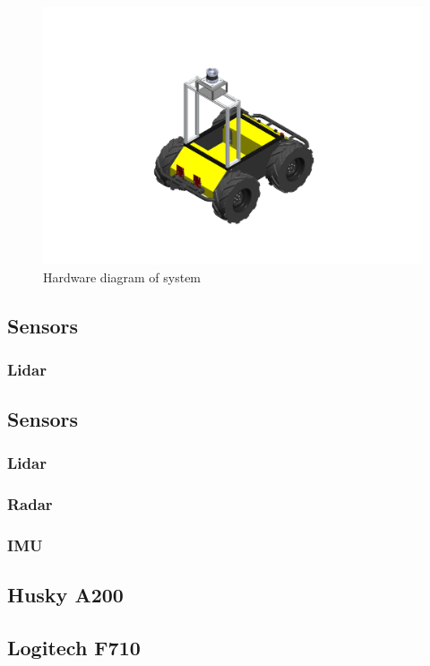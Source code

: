 \begin{figure}[H]
    \centering
    \includegraphics[scale=0.5]{Figures/CAD/huskyWithSensors.PNG}
    \caption{Hardware diagram of system}
    \label{fig:HWdiagram}
\end{figure}
\subsection{Sensors}
\subsubsection{Lidar}

\subsection{Sensors}
\subsubsection{Lidar}

\subsubsection{Radar}
\subsubsection{IMU}
\subsection{Husky A200}
\subsection{Logitech F710}
